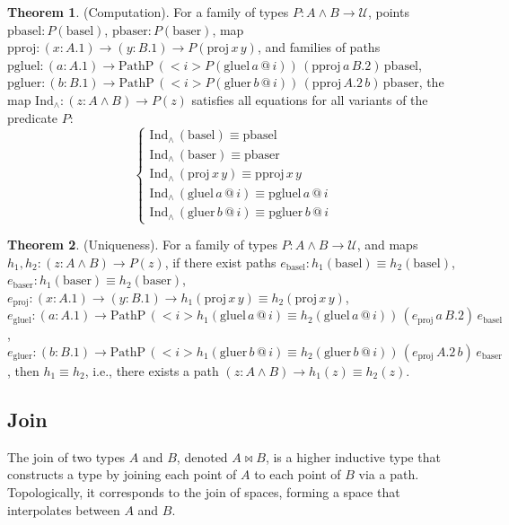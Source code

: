 \documentclass{article}
\theoremstyle{definition}
\newtheorem{theorem}{Theorem}
\begin{document}
\begin{theorem} (Computation).
For a family of types \( P : A \wedge B \to \mathcal{U} \),
points \( \text{pbasel} : P(\text{basel}) \),
\( \text{pbaser} : P(\text{baser}) \),
map \( \text{pproj} : (x : A.1) \to (y : B.1) \to P(\text{proj} \, x \, y) \),
and families of paths
\( \text{pgluel} : (a : A.1) \to \text{PathP} \, (<i> P(\text{gluel} \, a \, @ \, i)) \, (\text{pproj} \, a \, B.2) \, \text{pbasel} \),
\( \text{pgluer} : (b : B.1) \to \text{PathP} \, (<i> P(\text{gluer} \, b \, @ \, i)) \, (\text{pproj} \, A.2 \, b) \, \text{pbaser} \),
the map \( \text{Ind}_\wedge : (z : A \wedge B) \to P(z) \) satisfies all equations for all variants
of the predicate \( P \):
\[
\begin{cases}
\text{Ind}_\wedge \, (\text{basel}) \equiv \text{pbasel} \\
\text{Ind}_\wedge \, (\text{baser}) \equiv \text{pbaser} \\
\text{Ind}_\wedge \, (\text{proj} \, x \, y) \equiv \text{pproj} \, x \, y \\
\text{Ind}_\wedge \, (\text{gluel} \, a \, @ \, i) \equiv \text{pgluel} \, a \, @ \, i \\
\text{Ind}_\wedge \, (\text{gluer} \, b \, @ \, i) \equiv \text{pgluer} \, b \, @ \, i
\end{cases}
\]
\end{theorem}

\begin{theorem} (Uniqueness).
For a family of types \( P : A \wedge B \to \mathcal{U} \),
and maps \( h_1, h_2 : (z : A \wedge B) \to P(z) \),
if there exist paths
\( e_{\text{basel}} : h_1(\text{basel}) \equiv h_2(\text{basel}) \),
\( e_{\text{baser}} : h_1(\text{baser}) \equiv h_2(\text{baser}) \),
\( e_{\text{proj}} : (x : A.1) \to (y : B.1) \to h_1(\text{proj} \, x \, y) \equiv h_2(\text{proj} \, x \, y) \),
\( e_{\text{gluel}} : (a : A.1) \to \text{PathP} \, (<i> h_1(\text{gluel} \, a \, @ \, i) \equiv h_2(\text{gluel} \, a \, @ \, i)) \, (e_{\text{proj}} \, a \, B.2) \, e_{\text{basel}} \),
\( e_{\text{gluer}} : (b : B.1) \to \text{PathP} \, (<i> h_1(\text{gluer} \, b \, @ \, i) \equiv h_2(\text{gluer} \, b \, @ \, i)) \, (e_{\text{proj}} \, A.2 \, b) \, e_{\text{baser}} \),
then \( h_1 \equiv h_2 \), i.e., there exists a path \( (z : A \wedge B) \to h_1(z) \equiv h_2(z) \).
\end{theorem}

\newpage
\subsection{Join}
The join of two types \( A \) and \( B \), denoted \( A \Join B \),
is a higher inductive type that constructs a type by
joining each point of \( A \) to each point of \( B \) via a path.
Topologically, it corresponds to the join of spaces, forming
a space that interpolates between \( A \) and \( B \).
\end{document}
